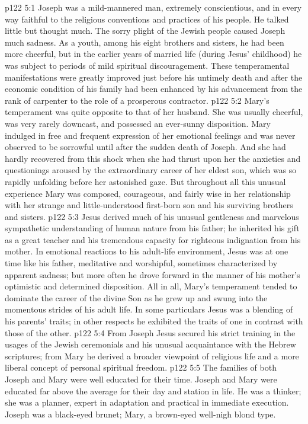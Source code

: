 \vs p122 5:1 Joseph was a mild\hyp{}mannered man, extremely conscientious, and in every way faithful to the religious conventions and practices of his people. He talked little but thought much. The sorry plight of the Jewish people caused Joseph much sadness. As a youth, among his eight brothers and sisters, he had been more cheerful, but in the earlier years of married life (during Jesus’ childhood) he was subject to periods of mild spiritual discouragement. These temperamental manifestations were greatly improved just before his untimely death and after the economic condition of his family had been enhanced by his advancement from the rank of carpenter to the role of a prosperous contractor.
\vs p122 5:2 Mary’s temperament was quite opposite to that of her husband. She was usually cheerful, was very rarely downcast, and possessed an ever\hyp{}sunny disposition. Mary indulged in free and frequent expression of her emotional feelings and was never observed to be sorrowful until after the sudden death of Joseph. And she had hardly recovered from this shock when she had thrust upon her the anxieties and questionings aroused by the extraordinary career of her eldest son, which was so rapidly unfolding before her astonished gaze. But throughout all this unusual experience Mary was composed, courageous, and fairly wise in her relationship with her strange and little\hyp{}understood first\hyp{}born son and his surviving brothers and sisters.
\vs p122 5:3 Jesus derived much of his unusual gentleness and marvelous sympathetic understanding of human nature from his father; he inherited his gift as a great teacher and his tremendous capacity for righteous indignation from his mother. In emotional reactions to his adult\hyp{}life environment, Jesus was at one time like his father, meditative and worshipful, sometimes characterized by apparent sadness; but more often he drove forward in the manner of his mother’s optimistic and determined disposition. All in all, Mary’s temperament tended to dominate the career of the divine Son as he grew up and swung into the momentous strides of his adult life. In some particulars Jesus was a blending of his parents’ traits; in other respects he exhibited the traits of one in contrast with those of the other.
\vs p122 5:4 From Joseph Jesus secured his strict training in the usages of the Jewish ceremonials and his unusual acquaintance with the Hebrew scriptures; from Mary he derived a broader viewpoint of religious life and a more liberal concept of personal spiritual freedom.
\vs p122 5:5 The families of both Joseph and Mary were well educated for their time. Joseph and Mary were educated far above the average for their day and station in life. He was a thinker; she was a planner, expert in adaptation and practical in immediate execution. Joseph was a black\hyp{}eyed brunet; Mary, a brown\hyp{}eyed well\hyp{}nigh blond type.
